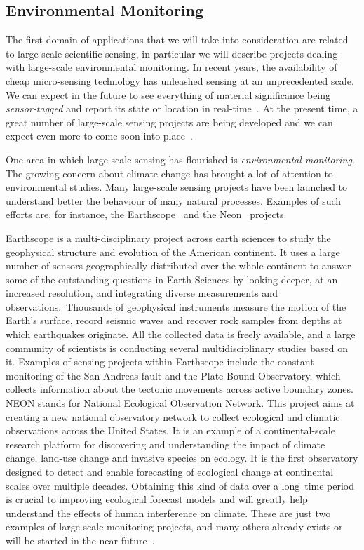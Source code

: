 \subsection*{Environmental Monitoring}
\label{envmon}
The first domain of applications that we will take into consideration are related to large-scale
scientific sensing, in particular we will describe projects dealing with large-scale environmental
monitoring.  In recent years, the availability of cheap micro-sensing technology has unleashed sensing
at an unprecedented scale. We can expect in the future to see everything of material significance being \emph{sensor-tagged} and report its state or location in
real-time~\cite{irisnet,qpsn,stream-processing-challanges}. At the present time, a great number of
large-scale sensing projects are being developed and we can expect even more to come soon into
place~\cite{earthscope,neon,casa-lead,swissexp}.

One area in which large-scale sensing has flourished is \emph{environmental monitoring}. The growing
concern about climate change has brought a lot of attention to environmental studies. Many
large-scale sensing projects have been launched to understand better the behaviour of many natural
processes.
Examples of such efforts are, for instance, the Earthscope~\cite{earthscope} and the Neon~\cite{neon}
projects.

Earthscope is a multi-disciplinary project across earth sciences to study the geophysical structure and
evolution of the American continent. It uses a large number of sensors geographically distributed over
the whole continent to answer some of the outstanding questions in Earth Sciences by looking deeper, at
an increased resolution, and integrating diverse measurements and observations.~Thousands of geophysical
instruments measure the motion of the Earth's surface, record seismic waves and recover rock samples from
depths at which earthquakes originate. All the collected data is freely available, and a large community
of scientists is conducting several multidisciplinary studies based on it. Examples of sensing
projects within Earthscope include the constant monitoring of the San Andreas fault and the Plate Bound
Observatory, which collects information about the tectonic movements across active boundary zones.
NEON stands for National Ecological Observation Network. This project aims at creating a new national
observatory network to collect ecological and climatic observations across the United States. It is an
example of a continental-scale research platform for discovering and understanding the impact of climate
change, land-use change and invasive species on ecology. It is the first observatory designed to detect
and enable forecasting of ecological change at continental scales over multiple decades. Obtaining this
kind of data over a \mbox{long time} period is crucial to improving ecological forecast models and will
greatly help understand the effects of human interference on climate. These are just
two examples of large-scale monitoring projects, and many others already exists or will be started in the
near future~\cite{testban,skysurvey,neon,usvo}.

